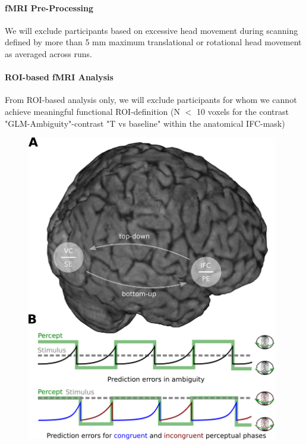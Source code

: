 \documentclass[12pt]{article}
\begin{document}
\paragraph{fMRI Pre-Processing} 

We will exclude participants based on excessive head movement during scanning defined by more than 5 mm maximum translational or rotational head movement as averaged across runs.

\paragraph{ROI-based fMRI Analysis}

From ROI-based analysis only, we will exclude participants for whom we cannot achieve meaningful functional ROI-definition (N $<$ 10 voxels for the contrast "GLM-Ambiguity"-contrast "T vs baseline" within the anatomical IFC-mask) 


\clearpage
\begin{figure}[h]
\begin{center}
\includegraphics[width=11cm]{Figure_1.png}
\end{center}
\end{figure}
\end{document}
